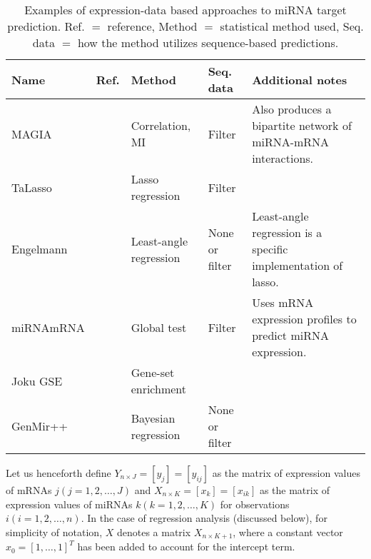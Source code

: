 \begin{table}
  \caption{Examples of expression-data based approaches to miRNA target prediction.
  Ref. $=$ reference, Method $=$ statistical method used, Seq. data $=$ how the method utilizes sequence-based predictions.}
  \label{table:expression-methods}
  \centering
  \begingroup\small
  \begin{tabular}{ llllp{4cm} }
    \\[-1ex] \hline\hline
    \textbf{Name} & \textbf{Ref.} & \textbf{Method} & \textbf{Seq. data} & \textbf{Additional notes} \\
    \hline
    MAGIA     & \citep{Sales2010}      & Correlation, MI        & Filter & Also produces a bipartite network of miRNA-mRNA interactions. \\
    TaLasso   & \citep{Muniategui2013} & Lasso regression       & Filter &  \\
    Engelmann & \citep{Engelmann2012}  & Least-angle regression & None or filter & Least-angle regression is a specific implementation of lasso. \\
    miRNAmRNA & \citep{vanIterson2013} & Global test & Filter   & Uses mRNA expression profiles to predict miRNA expression. \\
    Joku GSE  &                        & Gene-set enrichment    & \\
    GenMir++  & \citep{Huang2007}      & Bayesian regression    & None or filter & \\
    \hline\hline
    \end{tabular}
    \endgroup
\end{table}

Let us henceforth define $Y_{n \times J} = [y_j] = [y_{ij}]$ as the
matrix of expression values of mRNAs $j (j = 1, 2, \ldots, J)$ and
$X_{n \times K} = [x_k] = [x_{ik}]$ as the matrix of expression
values of miRNAs $k (k = 1, 2, \ldots, K)$ for observations $i (i = 1, 2, \ldots,
n)$. In the case of regression analysis (discussed below), for simplicity of
notation, $X$ denotes a matrix $X_{n \times K+1}$, where a constant
vector $x_0 = [1, \ldots, 1]^T$ has been added to account for the intercept term.


